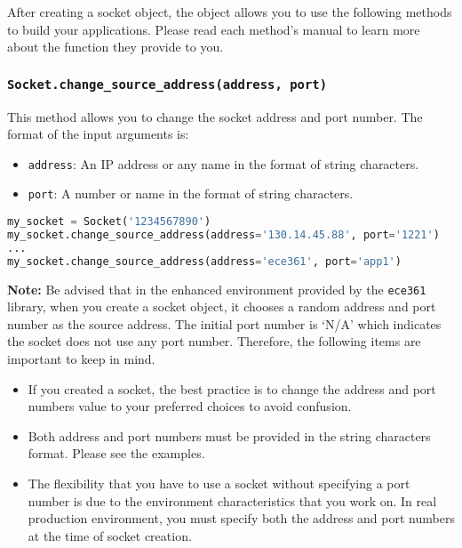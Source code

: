 \documentclass[11pt]{article}
\begin{document}
After creating a socket object, the object allows you to use the following methods to build your applications. Please read each method's manual to learn more about the function they provide to you.

\subsubsection{\texttt{Socket.\textbf{change\_source\_address(address, port)}}}
This method allows you to change the socket address and port number. The format of the input arguments is:
\begin{itemize}
    \item \texttt{address}: An IP address or any name in the format of string characters.
    \item \texttt{port}: A number or name in the format of string characters.
\end{itemize}

\begin{lstlisting}[caption={Example for using \texttt{change\_source\_address()}}, language=Python]
my_socket = Socket('1234567890')
my_socket.change_source_address(address='130.14.45.88', port='1221')
...
my_socket.change_source_address(address='ece361', port='app1')
\end{lstlisting}

\textbf{Note:}
Be advised that in the enhanced environment provided by the \texttt{ece361} library, when you create a socket object, it chooses a random address and port number as the source address. The initial port number is ‘N/A' which indicates the socket does not use any port number. Therefore, the following items are important to keep in mind.
\begin{itemize}
    \item If you created a socket, the best practice is to change the address and port numbers value to your preferred choices to avoid confusion.
    \item Both address and port numbers must be provided in the string characters format. Please see the examples.
    \item The flexibility that you have to use a socket without specifying a port number is due to the environment characteristics that you work on. In real production environment, you must specify both the address and port numbers at the time of socket creation.
\end{itemize}
\end{document}

